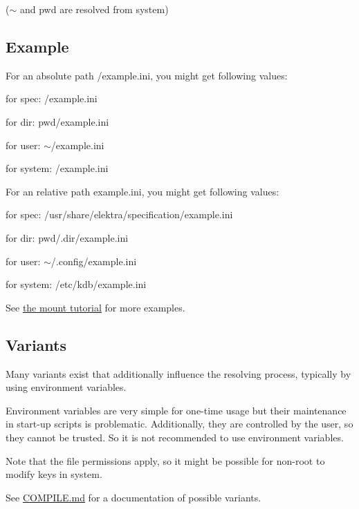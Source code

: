 ($\sim$ and {\ttfamily pwd} are resolved from system)

\subsection*{Example}

For an absolute path /example.ini, you might get following values\+:


\begin{DoxyItemize}
\item for spec\+: /example.ini
\item for dir\+: {\ttfamily pwd}/example.ini
\item for user\+: $\sim$/example.ini
\item for system\+: /example.ini
\end{DoxyItemize}

For an relative path example.\+ini, you might get following values\+:


\begin{DoxyItemize}
\item for spec\+: /usr/share/elektra/specification/example.ini
\item for dir\+: {\ttfamily pwd}/.dir/example.\+ini
\item for user\+: $\sim$/.config/example.\+ini
\item for system\+: /etc/kdb/example.ini
\end{DoxyItemize}

See \hyperlink{doc_tutorials_mount_md}{the mount tutorial} for more examples.

\subsection*{Variants}

Many variants exist that additionally influence the resolving process, typically by using environment variables.

Environment variables are very simple for one-\/time usage but their maintenance in start-\/up scripts is problematic. Additionally, they are controlled by the user, so they cannot be trusted. So it is not recommended to use environment variables.

Note that the file permissions apply, so it might be possible for non-\/root to modify keys in {\ttfamily system}.

See \hyperlink{doc_COMPILE_md}{C\+O\+M\+P\+I\+L\+E.md} for a documentation of possible variants.

